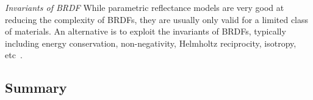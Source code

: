 \textit{Invariants of BRDF} 
While parametric reflectance models are very good at reducing the complexity of BRDFs, they are usually only valid for a limited class of materials. An alternative is to exploit the invariants of BRDFs, typically including energy conservation, non-negativity, Helmholtz reciprocity, isotropy, etc~\cite{zickler2002helmholtz,alldrin2007toward}.


\subsection{Summary}
